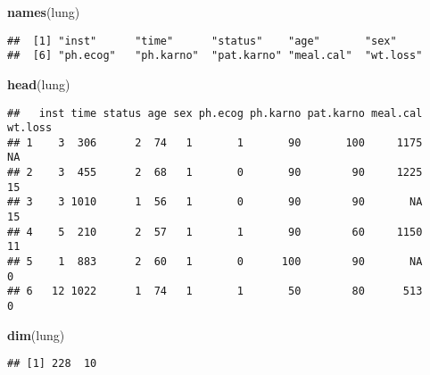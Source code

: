 \documentclass[]{book}
\newenvironment{Shaded}{\begin{snugshade}}{\end{snugshade}}
\newcommand{\KeywordTok}[1]{\textcolor[rgb]{0.13,0.29,0.53}{\textbf{#1}}}
\newcommand{\DecValTok}[1]{\textcolor[rgb]{0.00,0.00,0.81}{#1}}
\newcommand{\CommentTok}[1]{\textcolor[rgb]{0.56,0.35,0.01}{\textit{#1}}}
\newcommand{\OperatorTok}[1]{\textcolor[rgb]{0.81,0.36,0.00}{\textbf{#1}}}
\newcommand{\NormalTok}[1]{#1}
\theoremstyle{definition}
\theoremstyle{definition}
\theoremstyle{definition}
\theoremstyle{remark}
\begin{document}
\begin{Shaded}
\begin{Highlighting}[]
\KeywordTok{names}\NormalTok{(lung)}
\end{Highlighting}
\end{Shaded}

\begin{verbatim}
##  [1] "inst"      "time"      "status"    "age"       "sex"      
##  [6] "ph.ecog"   "ph.karno"  "pat.karno" "meal.cal"  "wt.loss"
\end{verbatim}

\begin{Shaded}
\begin{Highlighting}[]
\KeywordTok{head}\NormalTok{(lung)}
\end{Highlighting}
\end{Shaded}

\begin{verbatim}
##   inst time status age sex ph.ecog ph.karno pat.karno meal.cal wt.loss
## 1    3  306      2  74   1       1       90       100     1175      NA
## 2    3  455      2  68   1       0       90        90     1225      15
## 3    3 1010      1  56   1       0       90        90       NA      15
## 4    5  210      2  57   1       1       90        60     1150      11
## 5    1  883      2  60   1       0      100        90       NA       0
## 6   12 1022      1  74   1       1       50        80      513       0
\end{verbatim}

\begin{Shaded}
\begin{Highlighting}[]
\KeywordTok{dim}\NormalTok{(lung)}
\end{Highlighting}
\end{Shaded}

\begin{verbatim}
## [1] 228  10
\end{verbatim}

\begin{Shaded}
\end{Shaded}
\end{document}
